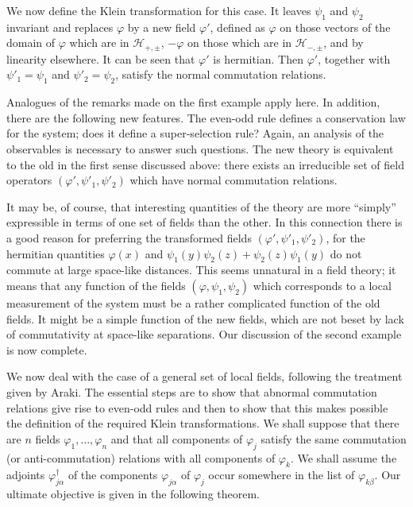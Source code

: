 We now define the Klein transformation for this case.  It leaves $\psi_1$ and
$\psi_2$ invariant and replaces $\varphi$ by a new field $\varphi'$, defined
as $\varphi$ on those vectors of the domain of $\varphi$ which are in
$\mathcal H_{+,\pm}$, $-\varphi$ on those which are in
$\mathcal H_{-,\pm}$, and by linearity elsewhere.  It can be seen that
$\varphi'$ is hermitian.  Then $\varphi'$, together with $\psi'_1=\psi_1$ and
$\psi'_2=\psi_2$, satisfy the normal commutation relations.

Analogues of the remarks made on the first example apply here.  In addition,
there are the following new features.  The even-odd rule defines a
conservation law for the system; does it define a super-selection rule?  Again,
an analysis of the observables is necessary to answer such questions.  The
new theory is equivalent to the old in the first sense discussed above: there
exists an irreducible set of field operators $(\varphi',\psi'_1,\psi'_2)$ which
have normal commutation relations.

It may be, of course, that interesting quantities of the theory are more
“simply” expressible in terms of one set of fields than the other.  In this
connection there is a good reason for preferring the transformed fields
$(\varphi',\psi'_1,\psi'_2)$, for the hermitian quantities $\varphi(x)$ and
$\psi_1(y)\psi_2(z)+\psi_2(z)\psi_1(y)$ do not commute at large space-like
distances.  This seems unnatural in a field theory; it means that any function
of the fields $(\varphi,\psi_1,\psi_2)$ which corresponds to a local
measurement of the system must be a rather complicated function of the old
fields.  It might be a simple function of the new fields, which are not beset
by lack of commutativity at space-like separations.  Our discussion of the
second example is now complete.

We now deal with the case of a general set of local fields, following the
treatment given by Araki.  The essential steps are to show that abnormal
commutation relations give rise to even-odd rules and then to show that this
makes possible the definition of the required Klein transformations.  We shall
suppose that there are $n$ fields $\varphi_1,\ldots,\varphi_n$ and that all
components of $\varphi_j$ satisfy the same commutation (or anti-commutation)
relations with all components of $\varphi_k$.  We shall assume the adjoints
$\varphi_{j\alpha}^\dagger$ of the components $\varphi_{j\alpha}$ of
$\varphi_j$ occur somewhere in the list of $\varphi_{k\beta}$.  Our ultimate
objective is given in the following theorem.


